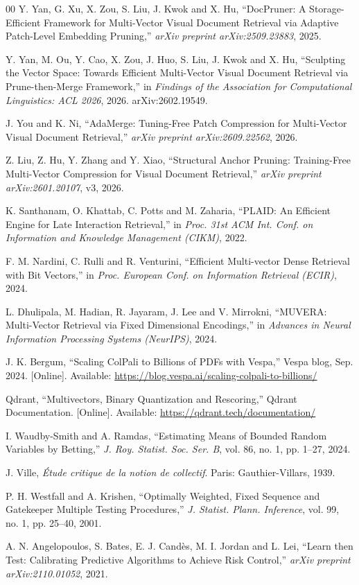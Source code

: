 \documentclass[conference]{IEEEtran}
\begin{document}
\begin{thebibliography}{00}
Y. Yan, G. Xu, X. Zou, S. Liu, J. Kwok and X. Hu, ``DocPruner: A
Storage-Efficient Framework for Multi-Vector Visual Document Retrieval via
Adaptive Patch-Level Embedding Pruning,'' \emph{arXiv preprint
arXiv:2509.23883}, 2025.

Y. Yan, M. Ou, Y. Cao, X. Zou, J. Huo, S. Liu, J. Kwok and X. Hu, ``Sculpting
the Vector Space: Towards Efficient Multi-Vector Visual Document Retrieval via
Prune-then-Merge Framework,'' in \emph{Findings of the Association for
Computational Linguistics: ACL 2026}, 2026. arXiv:2602.19549.

J. You and K. Ni, ``AdaMerge: Tuning-Free Patch Compression for Multi-Vector Visual
Document Retrieval,'' \emph{arXiv preprint arXiv:2609.22562}, 2026.

Z. Liu, Z. Hu, Y. Zhang and Y. Xiao, ``Structural Anchor Pruning:
Training-Free Multi-Vector Compression for Visual Document Retrieval,''
\emph{arXiv preprint arXiv:2601.20107}, v3, 2026.

K. Santhanam, O. Khattab, C. Potts and M. Zaharia, ``PLAID: An Efficient Engine for
Late Interaction Retrieval,'' in \emph{Proc. 31st ACM Int. Conf. on Information and
Knowledge Management (CIKM)}, 2022.

F. M. Nardini, C. Rulli and R. Venturini, ``Efficient Multi-vector Dense Retrieval
with Bit Vectors,'' in \emph{Proc. European Conf. on Information Retrieval (ECIR)},
2024.

L. Dhulipala, M. Hadian, R. Jayaram, J. Lee and V. Mirrokni, ``MUVERA: Multi-Vector
Retrieval via Fixed Dimensional Encodings,'' in \emph{Advances in Neural Information
Processing Systems (NeurIPS)}, 2024.

J. K. Bergum, ``Scaling ColPali to Billions of PDFs with Vespa,'' Vespa blog,
Sep. 2024. [Online]. Available: \url{https://blog.vespa.ai/scaling-colpali-to-billions/}

Qdrant, ``Multivectors, Binary Quantization and Rescoring,'' Qdrant
Documentation. [Online]. Available: \url{https://qdrant.tech/documentation/}

I. Waudby-Smith and A. Ramdas, ``Estimating Means of Bounded Random Variables by
Betting,'' \emph{J. Roy. Statist. Soc. Ser. B}, vol. 86, no. 1, pp. 1--27, 2024.

J. Ville, \emph{\'Etude critique de la notion de collectif}. Paris:
Gauthier-Villars, 1939.

P. H. Westfall and A. Krishen, ``Optimally Weighted, Fixed Sequence and Gatekeeper
Multiple Testing Procedures,'' \emph{J. Statist. Plann. Inference}, vol. 99, no. 1,
pp. 25--40, 2001.

A. N. Angelopoulos, S. Bates, E. J. Cand\`es, M. I. Jordan and L. Lei, ``Learn then
Test: Calibrating Predictive Algorithms to Achieve Risk Control,'' \emph{arXiv
preprint arXiv:2110.01052}, 2021.

\end{thebibliography}
\end{document}
